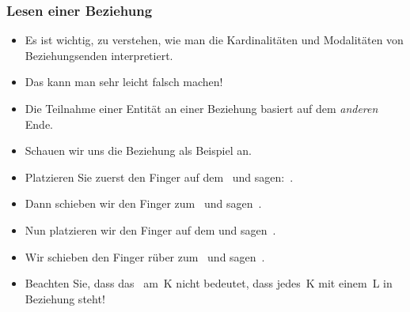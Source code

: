 \documentclass[aspectratio=169,mathserif,notheorems]{beamer}%
\begin{document}
\begin{frame}%
\frametitle{Lesen einer Beziehung}%
%
\begin{itemize}%
%
\item Es ist wichtig, zu verstehen, wie man die Kardinalitäten und Modalitäten von Beziehungsenden interpretiert.%
%
\item<2-> Das kann man sehr leicht falsch machen!%
%
\item<3-> Die Teilnahme einer Entität an einer Beziehung basiert auf dem \emph{anderen} Ende.%
%
\item<4-> Schauen wir uns die Beziehung  als Beispiel an.%
%
\item<5-> Platzieren Sie zuerst den Finger auf dem~ und sagen:~.%
%
\item<6-> Dann schieben wir den Finger zum~ und sagen~\cite{SE:DA:2016HDIRENCFTCTNL}.%
%
\item<7-> Nun platzieren wir den Finger auf dem  und sagen~.%
%
\item<8-> Wir schieben den Finger rüber zum~ und sagen~.%
%
\item<9-> Beachten Sie, dass das \crowsFootMandatoryOne\ am~K \alert{nicht} bedeutet, dass jedes~K mit einem~L in Beziehung steht!%
%
\end{itemize}%
\end{frame}%
%
\end{document}
